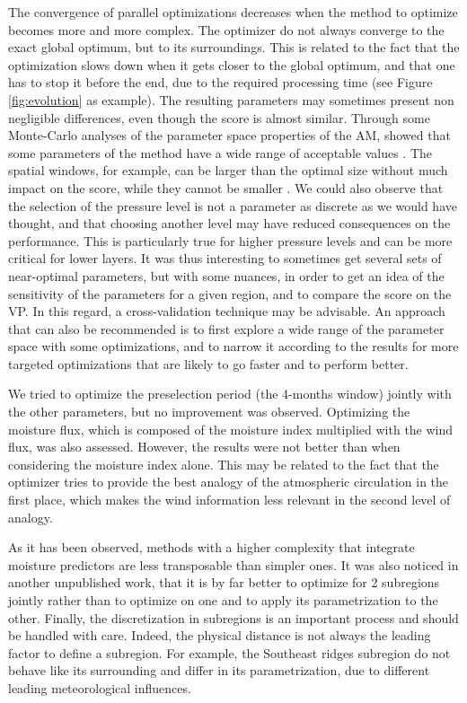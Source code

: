 \documentclass[5p]{elsarticle}
\begin{document}
The convergence of parallel optimizations decreases when the method to optimize becomes more and more complex. The optimizer do not always converge to the exact global optimum, but to its surroundings. This is related to the fact that the optimization slows down when it gets closer to the global optimum, and that one has to stop it before the end, due to the required processing time (see Figure \ref{fig:evolution} as example). The resulting parameters may sometimes present non negligible differences, even though the score is almost similar. Through some Monte-Carlo analyses of the parameter space properties of the AM, \citet{Horton2012a} showed that some parameters of the method have a wide range of acceptable values \citep[see also][]{Horton2016}. The spatial windows, for example, can be larger than the optimal size without much impact on the score, while they cannot be smaller \citep[see also][]{Bontron2004}. We could also observe that the selection of the pressure level is not a parameter as discrete as we would have thought, and that choosing another level may have reduced consequences on the performance. This is particularly true for higher pressure levels and can be more critical for lower layers. It was thus interesting to sometimes get several sets of near-optimal parameters, but with some nuances, in order to get an idea of the sensitivity of the parameters for a given region, and to compare the score on the VP. In this regard, a cross-validation technique may be advisable. An approach that can also be recommended is to first explore a wide range of the parameter space with some optimizations, and to narrow it according to the results for more targeted optimizations that are likely to go faster and to perform better.

We tried to optimize the preselection period (the 4-months window) jointly with the other parameters, but no improvement was observed. Optimizing the moisture flux, which is composed of the moisture index multiplied with the wind flux, was also assessed. However, the results were not better than when considering the moisture index alone. This may be related to the fact that the optimizer tries to provide the best analogy of the atmospheric circulation in the first place, which makes the wind information less relevant in the second level of analogy.

As it has been observed, methods with a higher complexity that integrate moisture predictors are less transposable than simpler ones. It was also noticed in another unpublished work, that it is by far better to optimize for 2 subregions jointly rather than to optimize on one and to apply its parametrization to the other. Finally, the discretization in subregions is an important process and should be handled with care. Indeed, the physical distance is not always the leading factor to define a subregion. For example, the Southeast ridges subregion do not behave like its surrounding and differ in its parametrization, due to different leading meteorological influences.
\end{document}
